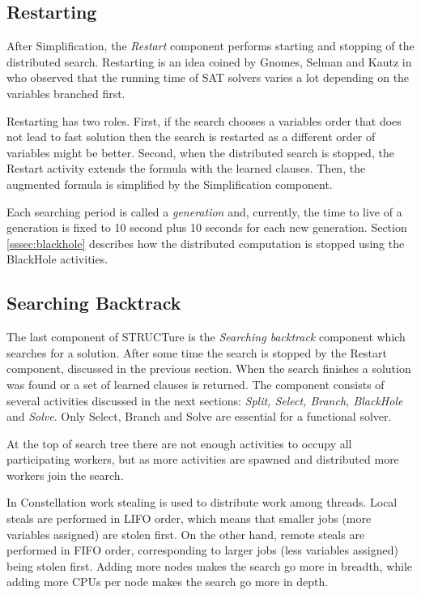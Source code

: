 \subsection{Restarting}
\label{ssec:restarting}

After Simplification, the \emph{Restart}
component performs starting and stopping of the distributed
search. Restarting is an idea coined by Gnomes, Selman and Kautz
in \cite{Gomes:1998:BCS:295240.295710} who observed that the
running time of SAT solvers varies a lot depending on the variables
branched first.

Restarting has two roles. First, if the search chooses a variables
order that does not lead to fast solution then the search is
restarted as a different order of variables might be better.  Second,
when the distributed search is stopped, the Restart activity extends
the formula with the learned clauses. Then, the augmented formula
is simplified by the Simplification component.

Each searching period is called a \emph{generation} and, currently,
the time to live of a generation is fixed to 10 second plus 10
seconds for each new generation.  Section \ref{sssec:blackhole}
describes how the distributed computation is stopped using the
BlackHole activities.


\subsection{Searching Backtrack}
\label{ssec:searching-tree}

The last component of STRUCTure is the \emph{Searching backtrack}
component which searches for a solution.  After some time the search
is stopped by the Restart component, discussed in the previous
section. When the search finishes a solution was found or a
set of learned clauses is returned. The component consists of several
activities discussed in the next sections: \emph{Split, Select,
Branch, BlackHole} and \emph{Solve}. Only Select, Branch and Solve
are essential for a functional solver.

At the top of search tree there are not enough activities to occupy
all participating workers, but as more activities are spawned and
distributed more workers join the search.

In Constellation work stealing is used to distribute work among
threads.  Local steals are performed in LIFO order, which means that
smaller jobs (more variables assigned) are stolen first.  On the
other hand, remote steals are performed in FIFO order, corresponding to
larger jobs (less variables assigned) being stolen first.  Adding more
nodes makes the search go more in breadth, while adding more CPUs
per node makes the search go more in depth.


